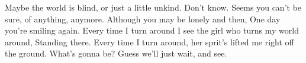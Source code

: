 Maybe the world is blind, or just a little unkind. Don't know. Seems you can't be sure, of anything, anymore. Although you may be lonely and then, One day you're smiling again. Every time I turn around I see the girl who turns my world around, Standing there. Every time I turn around, her sprit's lifted me right off the ground. What's gonna be? Guess we'll just wait, and see. 


